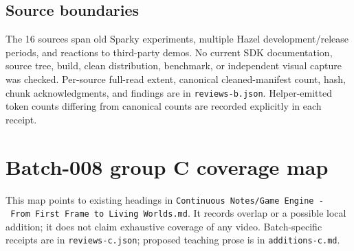 \section{Source boundaries}\label{appendix-877738f6f4d2-source-boundaries}

The 16 sources span old Sparky experiments, multiple Hazel development/release periods, and reactions to third-party demos. No current SDK documentation, source tree, build, clean distribution, benchmark, or independent visual capture was checked. Per-source full-read extent, canonical cleaned-manifest count, hash, chunk acknowledgments, and findings are in \texttt{reviews-b.json}. Helper-emitted token counts differing from canonical counts are recorded explicitly in each receipt.

\chapter{Batch-008 group C coverage map}\label{appendix-877738f6f4d2-batch-008-group-c-coverage-map}

This map points to existing headings in \texttt{Continuous\ Notes/Game\ Engine\ -\ From\ First\ Frame\ to\ Living\ Worlds.md}. It records overlap or a possible local addition; it does not claim exhaustive coverage of any video. Batch-specific receipts are in \texttt{reviews-c.json}; proposed teaching prose is in \texttt{additions-c.md}.

